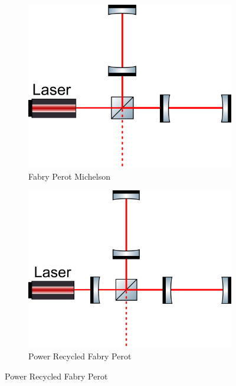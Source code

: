 		\begin{figure}[ht]
			\centering
			\begin{subfigure}[b]{0.3\textwidth}
				\centering
				\includegraphics[width=\textwidth]{../Figures/FP_Mich.png}
				\caption{Fabry Perot Michelson}
				\label{fig:FPMich}
			\end{subfigure}
			\hfill
			\begin{subfigure}[b]{0.3\textwidth}
				\centering
				\includegraphics[width=\textwidth]{../Figures/PRFP_Mich.png}
				\caption{Power Recycled Fabry Perot}
				\label{fig:PRFPMich}
			\end{subfigure}
			\hfill

\end{figure}
